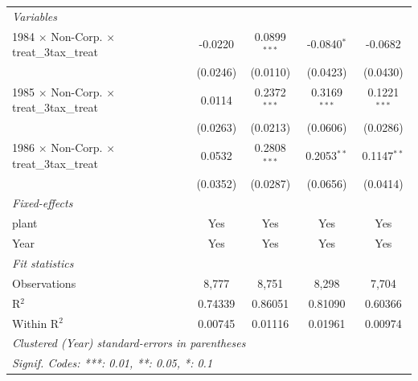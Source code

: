 \documentclass[
  12pt]{article}
\theoremstyle{definition}
\theoremstyle{remark}
\begin{document}
\begin{table}
\begin{minipage}{\linewidth}
\begin{tabular}{lcccc}
   \midrule
   \emph{Variables}\\
   1984 $\times$ Non-Corp. $\times$ treat\_3tax\_treat     & -0.0220            & 0.0899$^{***}$       & -0.0840$^{*}$       & -0.0682\\   
                                                           & (0.0246)           & (0.0110)             & (0.0423)            & (0.0430)\\   
   1985 $\times$ Non-Corp. $\times$ treat\_3tax\_treat     & 0.0114             & 0.2372$^{***}$       & 0.3169$^{***}$      & 0.1221$^{***}$\\   
                                                           & (0.0263)           & (0.0213)             & (0.0606)            & (0.0286)\\   
   1986 $\times$ Non-Corp. $\times$ treat\_3tax\_treat     & 0.0532             & 0.2808$^{***}$       & 0.2053$^{**}$       & 0.1147$^{**}$\\   
                                                           & (0.0352)           & (0.0287)             & (0.0656)            & (0.0414)\\   
   \midrule
   \emph{Fixed-effects}\\
   plant                                                   & Yes                & Yes                  & Yes                 & Yes\\  
   Year                                                    & Yes                & Yes                  & Yes                 & Yes\\  
   \midrule
   \emph{Fit statistics}\\
   Observations                                            & 8,777              & 8,751                & 8,298               & 7,704\\  
   R$^2$                                                   & 0.74339            & 0.86051              & 0.81090             & 0.60366\\  
   Within R$^2$                                            & 0.00745            & 0.01116              & 0.01961             & 0.00974\\  
   \midrule \midrule
   \multicolumn{5}{l}{\emph{Clustered (Year) standard-errors in parentheses}}\\
   \multicolumn{5}{l}{\emph{Signif. Codes: ***: 0.01, **: 0.05, *: 0.1}}\\
\end{tabular}
\par\endgroup
\begingroup
\centering
\begin{tabular}{lcccc}

\end{tabular}
\end{minipage}
\end{table}
\end{document}
